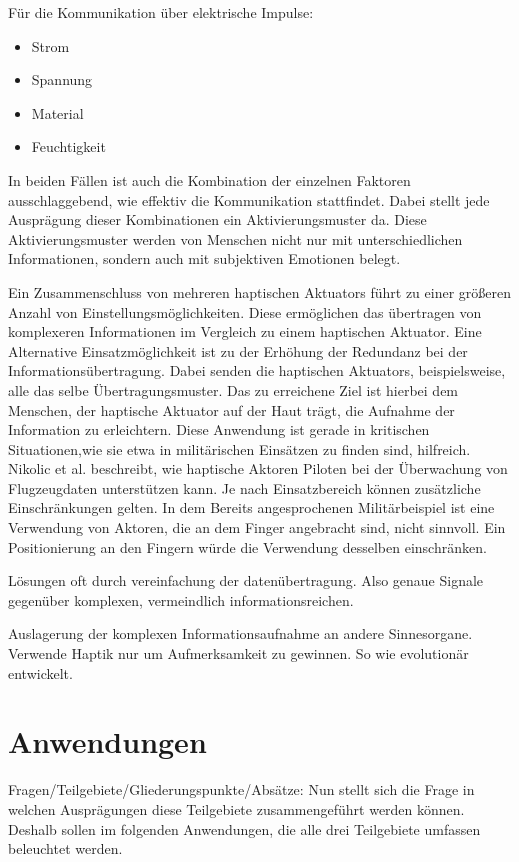 \documentclass{llncs}					%
\begin{document}
Für die Kommunikation über elektrische Impulse\cite[S.~4]{68204}:
\begin{itemize}
	\item Strom
	\item Spannung
	\item Material
	\item Feuchtigkeit
\end{itemize}

In beiden Fällen ist auch die Kombination der einzelnen Faktoren ausschlaggebend, wie effektiv die Kommunikation stattfindet. Dabei stellt jede Ausprägung dieser Kombinationen ein Aktivierungsmuster da. Diese Aktivierungsmuster werden von Menschen nicht nur mit unterschiedlichen Informationen, sondern auch mit subjektiven Emotionen belegt\cite{5444662}.%

Ein Zusammenschluss von mehreren haptischen \glspl{Aktuator} führt zu einer größeren Anzahl von Einstellungsmöglichkeiten. Diese ermöglichen das übertragen von komplexeren Informationen im Vergleich zu einem haptischen \gls{Aktuator}. Eine Alternative Einsatzmöglichkeit ist zu der Erhöhung der Redundanz bei der Informationsübertragung. Dabei senden die haptischen \glspl{Aktuator}, beispielsweise, alle das selbe Übertragungsmuster. Das zu erreichene Ziel ist hierbei dem Menschen, der haptische \gls{Aktuator} auf der Haut trägt, die Aufnahme der Information zu erleichtern. Diese Anwendung ist gerade in kritischen Situationen,wie sie etwa in militärischen Einsätzen zu finden sind, hilfreich\cite{nikolic1998multisensory}. Nikolic et al. \cite{nikolic1998multisensory} beschreibt, wie haptische Aktoren Piloten bei der Überwachung von Flugzeugdaten unterstützen kann.
Je nach Einsatzbereich können zusätzliche Einschränkungen gelten. In dem Bereits angesprochenen Militärbeispiel ist eine Verwendung von Aktoren, die an dem Finger angebracht sind, nicht sinnvoll. Ein Positionierung an den Fingern würde die Verwendung desselben einschränken.

Lösungen oft durch vereinfachung der datenübertragung. Also genaue Signale gegenüber komplexen, vermeindlich informationsreichen.

Auslagerung der komplexen Informationsaufnahme an andere Sinnesorgane. Verwende Haptik nur um Aufmerksamkeit zu gewinnen. So wie evolutionär entwickelt. \cite{doi:10.1518/001872008X250638}

\section{Anwendungen}
Fragen/Teilgebiete/Gliederungspunkte/Absätze:
Nun stellt sich die Frage in welchen Ausprägungen diese Teilgebiete zusammengeführt werden können. Deshalb sollen im folgenden Anwendungen, die alle drei Teilgebiete umfassen beleuchtet werden.
\end{document}
